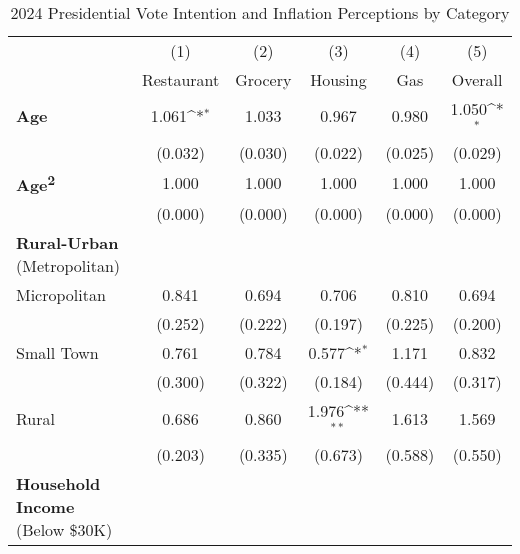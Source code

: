 \begin{table}[htbp]\centering \scriptsize

\def\sym#1{\ifmmode^{#1}\else\(^{#1}\)\fi}
\caption{2024 Presidential Vote Intention and Inflation Perceptions by Category}
\label{tab:vot}
\begin{tabular}{l*{5}{c}}
\hline\hline
                    &\multicolumn{1}{c}{(1)}&\multicolumn{1}{c}{(2)}&\multicolumn{1}{c}{(3)}&\multicolumn{1}{c}{(4)}&\multicolumn{1}{c}{(5)}\\
                    &\multicolumn{1}{c}{Restaurant}&\multicolumn{1}{c}{Grocery}&\multicolumn{1}{c}{Housing}&\multicolumn{1}{c}{Gas}&\multicolumn{1}{c}{Overall}\\
\hline
\textbf{Age}        &       1.061\sym{*}  &       1.033         &       0.967         &       0.980         &       1.050\sym{*}  \\
                    &     (0.032)         &     (0.030)         &     (0.022)         &     (0.025)         &     (0.029)         \\
\textbf{Age\textsuperscript{2}}&       1.000         &       1.000         &       1.000         &       1.000         &       1.000         \\
                    &     (0.000)         &     (0.000)         &     (0.000)         &     (0.000)         &     (0.000)         \\
\textbf{Rural-Urban} (Metropolitan) &  &  &  &   & \\
Micropolitan        &       0.841         &       0.694         &       0.706         &       0.810         &       0.694         \\
                    &     (0.252)         &     (0.222)         &     (0.197)         &     (0.225)         &     (0.200)         \\
Small Town          &       0.761         &       0.784         &       0.577\sym{*}  &       1.171         &       0.832         \\
                    &     (0.300)         &     (0.322)         &     (0.184)         &     (0.444)         &     (0.317)         \\
Rural               &       0.686         &       0.860         &       1.976\sym{**} &       1.613         &       1.569         \\
                    &     (0.203)         &     (0.335)         &     (0.673)         &     (0.588)         &     (0.550)         \\
\textbf{Household Income} (Below \$30K) &  &  &  &   & \\

\end{tabular}
\end{table}
